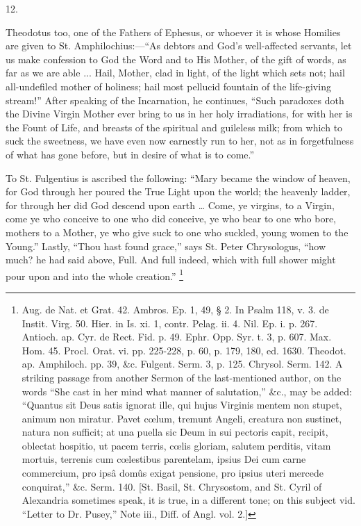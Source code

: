 12.

Theodotus too, one of the Fathers of Ephesus, or
whoever it is whose Homilies are given to St.
Amphilochius:—``As debtors and God's
well-affected servants, let us make confession to God the
Word and to His Mother, of the gift of words, as far as
we are able ... Hail, Mother, clad in light, of the light
which sets not; hail all-undefiled mother of holiness;
hail most pellucid fountain of the life-giving
stream!'' After speaking of the Incarnation, he
continues, ``Such paradoxes doth the Divine Virgin
Mother ever bring to us in her holy irradiations, for
with her is the Fount of Life, and breasts of the
spiritual and guileless milk; from which to suck the
sweetness, we have even now earnestly run to her, not as
in forgetfulness of what has gone before, but in desire
of what is to come.''

To St. Fulgentius is ascribed the following:
``Mary became the window of heaven, for God through
her poured the True Light upon the world; the heavenly
ladder, for through her did God descend upon earth …
Come, ye virgins, to a Virgin, come ye who conceive to
one who did conceive, ye who bear to one who bore,
mothers to a Mother, ye who give suck to one who suckled,
young women to the Young.'' Lastly, ``Thou hast
found grace,'' says St. Peter Chrysologus, ``how
much? he had said above, Full. And full indeed, which
with full shower might pour upon and into the whole
creation.'' \footnote{Aug. de Nat. et Grat. 42.
Ambros. Ep. 1, 49, § 2. In Psalm 118, v. 3. de Instit.
Virg. 50. Hier. in Is. xi. 1, contr. Pelag. ii. 4. Nil.
Ep. i. p. 267. Antioch. ap. Cyr. de Rect. Fid. p. 49.
Ephr. Opp. Syr. t. 3, p. 607. Max. Hom. 45. Procl. Orat.
vi. pp. 225-228, p. 60, p. 179, 180, ed. 1630. Theodot.
ap. Amphiloch. pp. 39, \&c. Fulgent. Serm. 3, p. 125.
Chrysol. Serm. 142. A striking passage from another
Sermon of the last-mentioned author, on the words ``She cast in her mind what manner of salutation,''
\&c., may be added: ``Quantus sit Deus satis
ignorat ille, qui hujus Virginis mentem non stupet,
animum non miratur. Pavet cœlum, tremunt Angeli,
creatura non sustinet, natura non sufficit; at una puella
sic Deum in sui pectoris capit, recipit, oblectat
hospitio, ut pacem terris, cœlis gloriam, salutem
perditis, vitam mortuis, terrenis cum cœlestibus
parentelam, ipsius Dei cum carne commercium, pro ipsâ
domûs exigat pensione, pro ipsius uteri mercede
conquirat,'' \&c. Serm. 140. [St. Basil, St.
Chrysostom, and St. Cyril of Alexandria sometimes speak,
it is true, in a different tone; on this subject vid.
``Letter to Dr. Pusey,'' Note iii., Diff. of
Angl. vol. 2.]}

